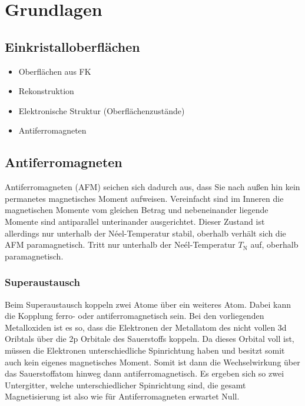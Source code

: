\chapter{Grundlagen}
    \section{Einkristalloberflächen}
        \begin{itemize}
            \item Oberflächen aus FK
            \item Rekonstruktion
            \item Elektronische Struktur (Oberflächenzustände)
            \item Antiferromagneten
        \end{itemize}

    \section{Antiferromagneten}
        Antiferromagneten (AFM) seichen sich dadurch aus, dass Sie nach außen hin kein permanetes magnetisches Moment aufweisen.
        Vereinfacht sind im Inneren die magnetischen Momente vom gleichen Betrag und nebeneinander liegende Momente sind antiparallel unterinander ausgerichtet.
        Dieser Zustand ist allerdings nur unterhalb der Néel-Temperatur stabil, oberhalb verhält sich die AFM paramagnetisch.
        Tritt nur unterhalb der Neél-Temperatur $T_\text{N}$ auf, oberhalb paramagnetisch.

        \subsection{Superaustausch}
        \label{sec:Super}
            Beim Superaustausch koppeln zwei Atome über ein weiteres Atom. 
            Dabei kann die Kopplung ferro- oder antiferromagnetisch sein.
            Bei den vorliegenden Metalloxiden ist es so, dass die Elektronen der Metallatom des nicht vollen 3d Oribtals über die 2p Orbitale des Sauerstoffs koppeln.
            Da dieses Orbital voll ist, müssen die Elektronen unterschiedliche Spinrichtung haben und besitzt somit auch kein eigenes magnetisches Moment.
            Somit ist dann die Wechselwirkung über das Sauerstoffatom hinweg dann antiferromagnetisch.
            Es ergeben sich so zwei Untergitter, welche unterschiedlicher Spinrichtung sind, die gesamt Magnetisierung ist also wie für Antiferromagneten erwartet Null.
    
